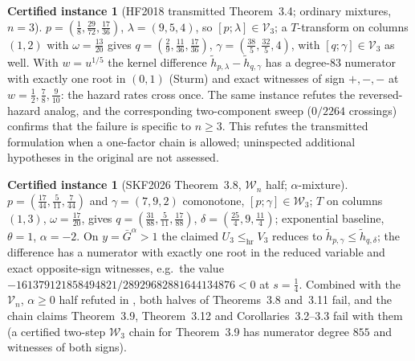 \documentclass[10pt]{article}
\theoremstyle{plain}
\theoremstyle{definition}
\newtheorem{certificate}[theorem]{Certified instance}
\theoremstyle{remark}
\newcommand{\hr}{\mathrm{hr}}
\newcommand{\Wn}{\mathcal W_n}
\begin{document}
\begin{certificate}[HF2018 transmitted Theorem~3.4; ordinary mixtures, $n=3$]\label{cer:hf}
$p=(\tfrac18,\tfrac{29}{72},\tfrac{17}{36})$, $\lambda=(9,5,4)$, so $[p;\lambda]\in\mathcal V_3$; a $T$-transform on columns $(1,2)$ with $\omega=\tfrac{13}{20}$ gives $q=(\tfrac29,\tfrac{11}{36},\tfrac{17}{36})$, $\gamma=(\tfrac{38}{5},\tfrac{32}{5},4)$, with $[q;\gamma]\in\mathcal V_3$ as well. With $w=u^{1/5}$ the kernel difference $\tilde h_{p,\lambda}-\tilde h_{q,\gamma}$ has a degree-$83$ numerator with exactly one root in $(0,1)$ (Sturm) and exact witnesses of sign $+,-,-$ at $w=\tfrac12,\tfrac78,\tfrac9{10}$: the hazard rates cross once. The same instance refutes the reversed-hazard analog, and the corresponding two-component sweep ($0/2264$ crossings) confirms that the failure is specific to $n\ge3$. This refutes the transmitted formulation when a one-factor chain is allowed; uninspected additional hypotheses in the original are not assessed.
\end{certificate}

\begin{certificate}[SKF2026 Theorem~3.8, $\Wn$ half; $\alpha$-mixture]\label{cer:skf}
$p=(\tfrac{17}{44},\tfrac5{11},\tfrac7{44})$ and $\gamma=(7,9,2)$ comonotone, $[p;\gamma]\in\mathcal W_3$; $T$ on columns $(1,3)$, $\omega=\tfrac{17}{20}$, gives $q=(\tfrac{31}{88},\tfrac5{11},\tfrac{17}{88})$, $\delta=(\tfrac{25}{4},9,\tfrac{11}{4})$; exponential baseline, $\theta=1$, $\alpha=-2$. On $y=\bar G^\alpha>1$ the claimed $U_3\le_{\hr}V_3$ reduces to $\tilde h_{p,\gamma}\le\tilde h_{q,\delta}$; the difference has a numerator with exactly one root in the reduced variable and exact opposite-sign witnesses, e.g.\ the value $-161379121858494821/28929682881644134876<0$ at $s=\tfrac14$. Combined with the $\mathcal V_n$, $\alpha\ge0$ half refuted in \cite{Guo2026hazard}, both halves of Theorems~3.8 and~3.11 fail, and the chain claims Theorem~3.9, Theorem~3.12 and Corollaries~3.2--3.3 fail with them (a certified two-step $\mathcal W_3$ chain for Theorem~3.9 has numerator degree $855$ and witnesses of both signs).
\end{certificate}
\end{document}
